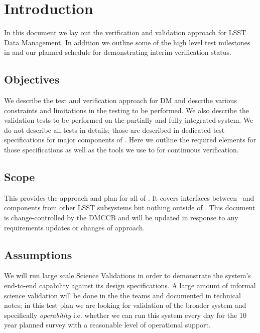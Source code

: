 
\section{Introduction \label{sect:intro}}
In this document  we lay out  the verification and validation approach for LSST Data Management. In addition we outline some of the high level test milestones in  and our planned schedule for demonstrating interim verification status.

\subsection{Objectives \label{sect:objectives}}

We describe the test and verification approach for DM and describe various constraints and limitations in the testing to be performed.
We also describe the validation tests to be performed on the partially and fully integrated system.
We do not describe all tests in details; those are described in dedicated test specifications for major components of \product. Here we outline the required elements for those specifications as well as the tools we use to for continuous verification.

\subsection{Scope \label{sect:scope}}

This provides the approach and plan for all of \product. It covers interfaces between \product\ and components from other LSST subsystems but nothing outside of \product.
This document is change-controlled by the DMCCB and will be updated in response to any requirements updates or changes of approach.

\subsection{Assumptions}
 We will run large scale Science Validations in order to demonstrate the system's end-to-end capability against its design specifications. A large amount of informal science validation will be done in the the teams and documented in technical notes; in this test plan we are looking for validation of the broader system and specifically \emph{operability} i.e. whether we can run this system every day for the 10 year planned survey with a reasonable level of operational support.

